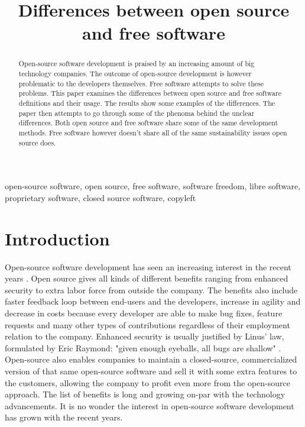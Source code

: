 \documentclass[conference]{IEEEtran}
\begin{document}
\title{Differences between open source and free software}

\author{
}

\maketitle

\begin{abstract}
Open-source software development is praised by an increasing amount of big technology companies. The outcome of open-source development is however problematic to the developers themselves. Free software attempts to solve these problems. This paper examines the differences between open source and free software definitions and their usage. The results show some examples of the differences. The paper then attempts to go through some of the phenoma behind the unclear differences. Both open source and free software share some of the same development methods. Free software however doesn't share all of the same sustainability issues open source does.
\end{abstract}

\begin{IEEEkeywords}
	open-source software, open source, free software, software freedom, libre software, proprietary software, closed source software, copyleft
\end{IEEEkeywords}

\section{Introduction}
Open-source software development has seen an increasing interest in the recent years \cite{openvsclosed}. Open source gives all kinds of different benefits ranging from enhanced security to extra labor force from outside the company. The benefits also include faster feedback loop between end-users and the developers, increase in agility and decrease in costs because every developer are able to make bug fixes, feature requests and many other types of contributions regardless of their employment relation to the company. Enhanced security is usually justified by Linus' law, formulated by Eric Raymond: "given enough eyeballs, all bugs are shallow" \cite{raymond1999cathedral}.
Open-source also enables companies to maintain a closed-source, commercialized version of that same open-source software and sell it with some extra features to the customers, allowing the company to profit even more from the open-source approach. The list of benefits is long and growing on-par with the technology advancements. It is no wonder the interest in open-source software development has grown with the recent years.
\end{document}
